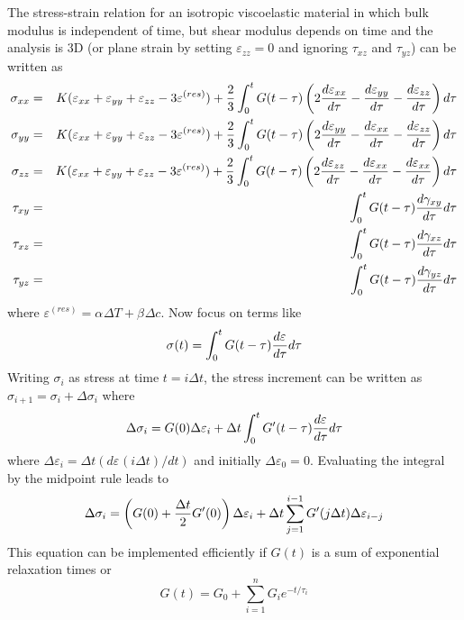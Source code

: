 \documentclass[11pt]{article}
\def\a#1{\alpha_{#1}}
\def\b#1{\beta_{#1}}
\def\DT{\Delta T}
\def\e#1{\varepsilon_{#1}}
\def\er#1{\varepsilon_{#1}^{(res)}}
\def\g#1{\gamma_{#1}}
\def\s#1{\sigma_{#1}}
\def\t#1{\tau_{#1}}
\begin{document}
The stress-strain relation for an isotropic viscoelastic material in which bulk modulus is independent of time, but shear modulus depends on time and the analysis is 3D (or plane strain by setting $\e{zz}=0$ and ignoring $\t{xz}$ and $\t{yz}$) can be written as
\begin{eqnarray}
      \s{xx} & = & K(\e{xx} + \e{yy} + \e{zz} - 3\er{}) + {2\over 3}\int_0^t G(t-\tau)
                           \left(2 {d\e{xx}\over d\tau} -  {d\e{yy}\over d\tau} - {d\e{zz}\over d\tau}\right) d\tau \\
      \s{yy} & = & K(\e{xx} + \e{yy} + \e{zz} - 3\er{}) + {2\over 3}\int_0^t G(t-\tau)
                           \left(2 {d\e{yy}\over d\tau} -  {d\e{xx}\over d\tau} - {d\e{zz}\over d\tau}\right) d\tau \\
      \s{zz} & = & K(\e{xx} + \e{yy} + \e{zz} - 3\er{}) + {2\over 3}\int_0^t G(t-\tau)
                           \left(2 {d\e{zz}\over d\tau} - {d\e{xx}\over d\tau} -  {d\e{xx}\over d\tau}\right) d\tau \\
       \t{xy} & = & \int_0^t G(t-\tau) {d\g{xy}\over d\tau} d\tau \\
       \t{xz} & = & \int_0^t G(t-\tau) {d\g{xz}\over d\tau} d\tau \\
       \t{yz} & = & \int_0^t G(t-\tau) {d\g{yz}\over d\tau} d\tau
\end{eqnarray}
where $\er{} = \a{}\DT + \b{}\Delta c$.
Now focus on terms like
\begin{equation}
       \s{}(t) = \int_0^t G(t-\tau) {d\e{}\over d\tau} d\tau
\end{equation}
Writing $\s{i}$ as stress at time $t=i\Delta t$, the stress increment can be written as $\s{i+1}=\s{i}+\Delta \s{i}$ where
\begin{equation}
    \Delta \s{i} = G(0)\Delta \e{i} + \Delta t \int_0^t G'(t-\tau) {d\e{}\over d\tau} d\tau
\end{equation}
where $\Delta \e{i} = \Delta t (d\e{}(i\Delta t)/dt)$ and initially $\Delta \e{0}=0$. Evaluating the integral by the midpoint rule leads to
\begin{equation}
    \Delta \s{i} = \left(G(0) + {\Delta t\over 2}G'(0)\right)\Delta \e{i} 
                          + \Delta t \sum_{j=1}^{i-1} G'(j\Delta t)\Delta \e{i-j}
\end{equation}
This equation can be implemented efficiently if $G(t)$ is a sum of exponential relaxation times or
\begin{equation}
        G(t) = G_0 + \sum_{i=1}^n G_i e^{-t/\tau_i}
\end{equation}
\end{document}
